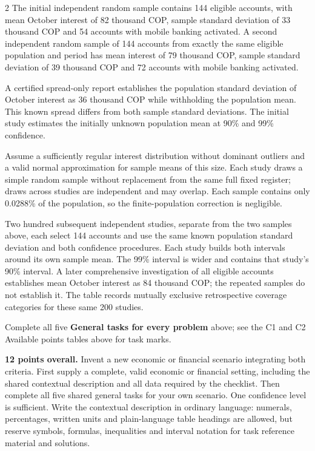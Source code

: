 \begin{multicols}{2}
The initial independent random sample contains 144 eligible accounts, with mean October interest of 82 thousand COP, sample standard deviation of 33 thousand COP and 54 accounts with mobile banking activated. A second independent random sample of 144 accounts from exactly the same eligible population and period has mean interest of 79 thousand COP, sample standard deviation of 39 thousand COP and 72 accounts with mobile banking activated.

A certified spread-only report establishes the population standard deviation of October interest as 36 thousand COP while withholding the population mean. This known spread differs from both sample standard deviations. The initial study estimates the initially unknown population mean at 90\% and 99\% confidence.

Assume a sufficiently regular interest distribution without dominant outliers and a valid normal approximation for sample means of this size. Each study draws a simple random sample without replacement from the same full fixed register; draws across studies are independent and may overlap. Each sample contains only 0.0288\% of the population, so the finite-population correction is negligible.

Two hundred subsequent independent studies, separate from the two samples above, each select 144 accounts and use the same known population standard deviation and both confidence procedures. Each study builds both intervals around its own sample mean. The 99\% interval is wider and contains that study's 90\% interval. A later comprehensive investigation of all eligible accounts establishes mean October interest as 84 thousand COP; the repeated samples do not establish it. The table records mutually exclusive retrospective coverage categories for these same 200 studies.


\par\smallskip
Complete all five \textbf{General tasks for every problem} above; see the C1 and C2 Available points tables above for task marks.


\textbf{12 points overall.}
Invent a new economic or financial scenario integrating both criteria. First supply a complete, valid economic or financial setting, including the shared contextual description and all data required by the checklist. Then complete all five shared general tasks for your own scenario. One confidence level is sufficient. Write the contextual description in ordinary language: numerals, percentages, written units and plain-language table headings are allowed, but reserve symbols, formulas, inequalities and interval notation for task reference material and solutions.


\end{multicols}
